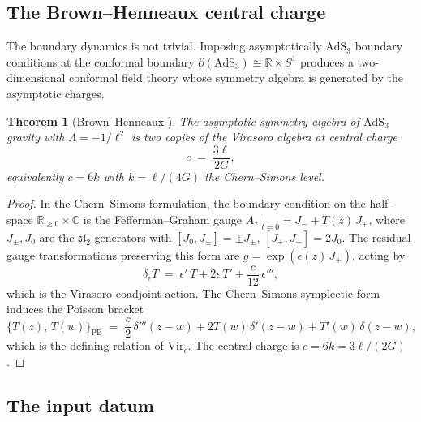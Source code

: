 \documentclass[11pt,reqno]{amsart}
\newtheorem{theorem}{Theorem}[section]
\theoremstyle{definition}
\theoremstyle{remark}
\begin{document}
\subsection{The Brown--Henneaux central charge}

The boundary dynamics is not trivial. Imposing asymptotically
$\mathrm{AdS}_3$ boundary conditions at the conformal boundary
$\partial(\mathrm{AdS}_3) \cong \mathbb{R} \times S^1$ produces
a two-dimensional conformal field theory whose symmetry algebra is
generated by the asymptotic charges.

\begin{theorem}[Brown--Henneaux \cite{BH86}]
\label{thm:brown-henneaux}
The asymptotic symmetry algebra of\/ $\mathrm{AdS}_3$ gravity with
$\Lambda = -1/\ell^2$ is two copies of the Virasoro algebra at
central charge
\begin{equation}\label{eq:brown-henneaux}
c \;=\; \frac{3\ell}{2G},
\end{equation}
equivalently $c = 6k$ with $k = \ell/(4G)$ the Chern--Simons level.
\end{theorem}

\begin{proof}
In the Chern--Simons formulation, the boundary condition on the
half-space $\mathbb{R}_{\ge 0} \times \mathbb{C}$ is the
Fefferman--Graham gauge
$A_z|_{t=0} = J_- + T(z)\,J_+$, where $J_\pm, J_0$ are the
$\mathfrak{sl}_2$ generators with
$[J_0, J_\pm] = \pm J_\pm$, $[J_+, J_-] = 2J_0$.
The residual gauge transformations preserving this form are
$g = \exp(\epsilon(z)\,J_+)$, acting by
\begin{equation}\label{eq:vir-coadjoint}
\delta_\epsilon T \;=\;
\epsilon'\,T + 2\epsilon\,T' + \frac{c}{12}\,\epsilon''',
\end{equation}
which is the Virasoro coadjoint action. The Chern--Simons symplectic
form induces the Poisson bracket
\begin{equation}\label{eq:vir-poisson}
\{T(z),\, T(w)\}_{\mathrm{PB}} \;=\;
\frac{c}{2}\,\delta'''(z{-}w)
+ 2T(w)\,\delta'(z{-}w)
+ T'(w)\,\delta(z{-}w),
\end{equation}
which is the defining relation of
$\mathrm{Vir}_c$. The central charge is
$c = 6k = 3\ell/(2G)$.
\end{proof}

\subsection{The input datum}
\end{document}
